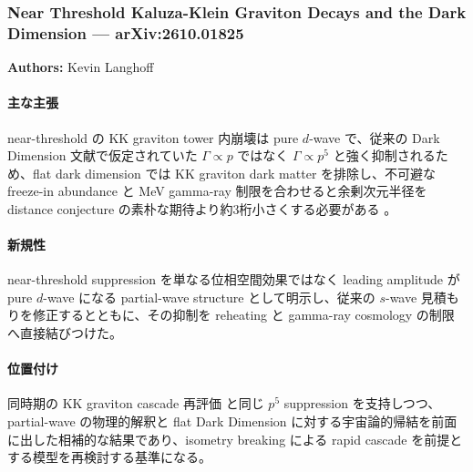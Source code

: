 \subsubsection{Near Threshold Kaluza-Klein Graviton Decays and the Dark Dimension --- arXiv:2610.01825}

\textbf{Authors:} Kevin Langhoff

\paragraph{主な主張}
near-threshold の KK graviton tower 内崩壊は pure $d$-wave で、従来の Dark Dimension 文献で仮定されていた $\Gamma\propto p$ ではなく $\Gamma\propto p^5$ と強く抑制されるため、flat dark dimension では KK graviton dark matter を排除し、不可避な freeze-in abundance と MeV gamma-ray 制限を合わせると余剰次元半径を distance conjecture の素朴な期待より約3桁小さくする必要がある \cite{Langhoff:2026NearThreshold}。

\paragraph{新規性}
near-threshold suppression を単なる位相空間効果ではなく leading amplitude が pure $d$-wave になる partial-wave structure として明示し、従来の $s$-wave 見積もりを修正するとともに、その抑制を reheating と gamma-ray cosmology の制限へ直接結びつけた。

\paragraph{位置付け}
同時期の KK graviton cascade 再評価 \cite{Lee:2026KKCascade} と同じ $p^5$ suppression を支持しつつ、partial-wave の物理的解釈と flat Dark Dimension に対する宇宙論的帰結を前面に出した相補的な結果であり、isometry breaking による rapid cascade を前提とする模型を再検討する基準になる。
